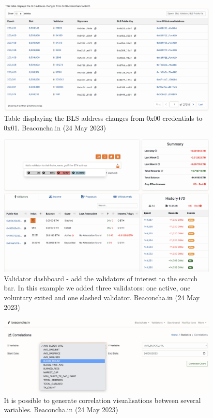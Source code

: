 \documentclass[UTF8]{article}
\begin{document}
\begin{figure}[htbp]
\begin{center}
\includegraphics[width=0.9\linewidth]{images/bblschgs}
\caption{Table displaying the BLS address changes from 0x00 credentials to 0x01. Beaconcha.in (24 May 2023)}
\label{fig:bblschgs}
\end{center}
\end{figure}

\begin{figure}[htbp]
\begin{center}
\includegraphics[width=0.9\linewidth]{images/bvaldashboard}
\caption{Validator dashboard - add the validators of interest to the search bar. In this example we added three validators: one active, one voluntary exited and one slashed validator. Beaconcha.in (24 May 2023)}
\label{fig:bvaldashboard}
\end{center}
\end{figure}

\begin{figure}[htbp]
\begin{center}
\includegraphics[width=0.9\linewidth]{images/bcorrelations}
\caption{It is possible to generate correlation visualisations between several variables. Beaconcha.in (24 May 2023)}
\label{fig:bcorrelations}
\end{center}
\end{figure}
\end{document}
